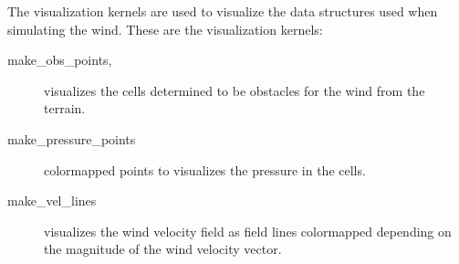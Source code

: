 The visualization kernels are used to visualize the data structures used when 
simulating the wind. These are the visualization kernels:

\begin{description}
	\item[make\_obs\_points,] visualizes the cells determined to be obstacles 
	for the wind from the terrain. 
	\item[make\_pressure\_points] colormapped points to visualizes the pressure 
	in the cells. 
	\item[make\_vel\_lines] visualizes the wind velocity field as field lines 
	colormapped depending on the magnitude of the wind velocity vector. 
\end{description}

